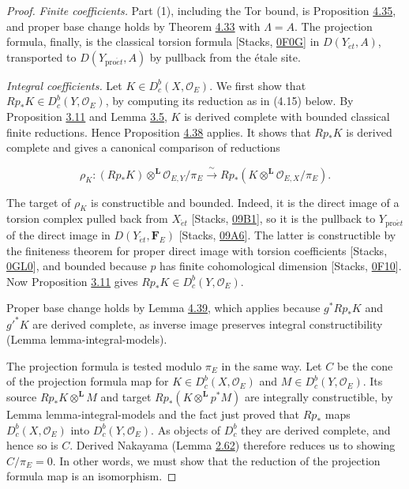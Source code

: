 \documentclass[11pt]{article}
\providecommand{\Dbc}{}\renewcommand{\Dbc}{D^b_c}
\begin{document}
\begin{proof}[{Proof}]\label{bp406}%
\emph{Finite coefficients.} Part (1), including the Tor bound, is Proposition \hyperref[bp390]{4.35}, and proper base change holds by Theorem \hyperref[bp382]{4.33} with \(\Lambda=A\). The projection formula, finally, is the classical torsion formula [Stacks, \href{https://stacks.math.columbia.edu/tag/0F0G}{0F0G}] in \(D(Y_{\acute{e}t},A)\), transported to \(D(Y_{\mathrm{pro}\acute{e}t},A)\) by pullback from the étale site.

\emph{Integral coefficients.} Let \(K\in\Dbc(X,\mathcal O_E)\). We first show that \(Rp_*K\in\Dbc(Y,\mathcal O_E)\), by computing its reduction as in (4.15) below. By Proposition \hyperref[bp226]{3.11} and Lemma \hyperref[bp208]{3.5}, \(K\) is derived complete with bounded classical finite reductions. Hence Proposition \hyperref[bp397]{4.38} applies. It shows that \(Rp_*K\) is derived complete and gives a canonical comparison of reductions

\[
\rho_K:(Rp_*K)\otimes^{\mathbf L}\mathcal O_{E,Y}/\pi_E
\xrightarrow{\ \sim\ } Rp_*(K\otimes^{\mathbf L}\mathcal O_{E,X}/\pi_E).
\tag{4.15}
\]

The target of \(\rho_K\) is constructible and bounded. Indeed, it is the direct image of a torsion complex pulled back from \(X_{\acute{e}t}\) [Stacks, \href{https://stacks.math.columbia.edu/tag/09B1}{09B1}], so it is the pullback to \(Y_{\mathrm{pro}\acute{e}t}\) of the direct image in \(D(Y_{\acute{e}t},\mathbf F_E)\) [Stacks, \href{https://stacks.math.columbia.edu/tag/09A6}{09A6}]. The latter is constructible by the finiteness theorem for proper direct image with torsion coefficients [Stacks, \href{https://stacks.math.columbia.edu/tag/0GL0}{0GL0}], and bounded because \(p\) has finite cohomological dimension [Stacks, \href{https://stacks.math.columbia.edu/tag/0F10}{0F10}]. Now Proposition \hyperref[bp226]{3.11} gives \(Rp_*K\in\Dbc(Y,\mathcal O_E)\).

Proper base change holds by Lemma \hyperref[bp400]{4.39}, which applies because \(g^*Rp_*K\) and \(g'^*K\) are derived complete, as inverse image preserves integral constructibility (Lemma lemma-integral-models).

The projection formula is tested modulo \(\pi_E\) in the same way. Let \(C\) be the cone of the projection formula map for \(K\in\Dbc(X,\mathcal O_E)\) and \(M\in\Dbc(Y,\mathcal O_E)\). Its source \(Rp_*K\otimes^{\mathbf L}M\) and target \(Rp_*(K\otimes^{\mathbf L}p^*M)\) are integrally constructible, by Lemma lemma-integral-models and the fact just proved that \(Rp_*\) maps \(\Dbc(X,\mathcal O_E)\) into \(\Dbc(Y,\mathcal O_E)\). As objects of \(\Dbc\) they are derived complete, and hence so is \(C\). Derived Nakayama (Lemma \hyperref[bp190]{2.62}) therefore reduces us to showing \(C/\pi_E=0\). In other words, we must show that the reduction of the projection formula map is an isomorphism.


\end{proof}
\end{document}
